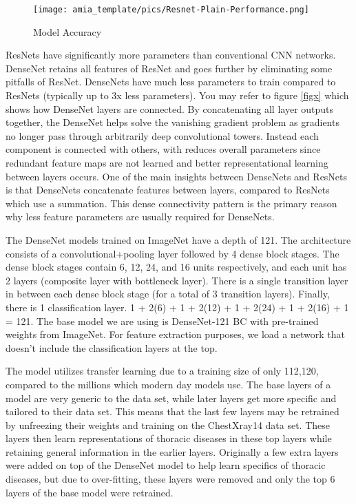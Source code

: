 \documentclass{amia}
\begin{document}
\begin{figure}[h!]
\centering
\texttt{[image: amia\_template/pics/Resnet-Plain-Performance.png]}
\caption{Model Accuracy}
\label{fig3}
\end{figure}

ResNets have significantly more parameters than conventional CNN networks. DenseNet retains all features of ResNet and goes further by eliminating some pitfalls of ResNet. DenseNets have much less parameters to train compared to ResNets (typically up to 3x less parameters). You may refer to figure \ref{figx} which shows how DenseNet layers are connected. By concatenating all layer outputs together, the DenseNet helps solve the vanishing gradient problem as gradients no longer pass through arbitrarily deep convolutional towers. Instead each component is connected with others, with reduces overall parameters since redundant feature maps are not learned and better representational learning between layers occurs. One of the main insights between DenseNets and ResNets is that DenseNets concatenate features between layers, compared to ResNets which use a summation. This dense connectivity pattern is the primary reason why less feature parameters are usually required for DenseNets.

The DenseNet models trained on ImageNet have a depth of 121. The architecture consists of a convolutional+pooling layer followed by 4 dense block stages. The dense block stages contain 6, 12, 24, and 16 units respectively, and each unit has 2 layers (composite layer with bottleneck layer). There is a single transition layer in between each dense block stage (for a total of 3 transition layers). Finally, there is 1 classification layer. 1 + 2(6) + 1 + 2(12) + 1 + 2(24) + 1 + 2(16) + 1 = 121. The base model we are using is DenseNet-121 BC with pre-trained weights from ImageNet. For feature extraction purposes, we load a network that doesn't include the classification layers at the top.

The model utilizes transfer learning due to a training size of only 112,120, compared to the millions which modern day models use. The base layers of a model are very generic to the data set, while later layers get more specific and tailored to their data set. This means that the last few layers may be retrained by unfreezing their weights and training on the ChestXray14 data set. These layers then learn representations of thoracic diseases in these top layers while retaining general information in the earlier layers. Originally a few extra layers were added on top of the DenseNet model to help learn specifics of thoracic diseases, but due to over-fitting, these layers were removed and only the top 6 layers of the base model were retrained.
\end{document}
